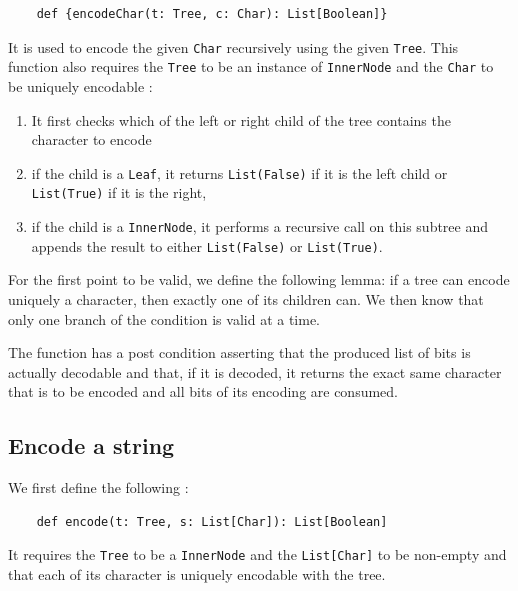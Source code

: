 \documentclass[a4paper,UKenglish,cleveref, autoref, thm-restate]{lipics-v2021}
\begin{document}
\begin{lstlisting}
    def {encodeChar(t: Tree, c: Char): List[Boolean]} 
\end{lstlisting}

It is used to encode the given \lstinline{Char} recursively using the given \lstinline{Tree}. This function also requires the \lstinline{Tree} to be an instance of \lstinline{InnerNode} 
and the \lstinline{Char} to be uniquely encodable :

\begin{enumerate}
    \item It first checks which of the left or right child of the tree contains the character to encode
    \item if the child is a \lstinline{Leaf}, it returns \lstinline{List(False)} if it is the left child or \lstinline{List(True)} if it is the right,
    \item if the child is a \lstinline{InnerNode}, it performs a recursive call on this subtree and appends the result to either \lstinline{List(False)} or \lstinline{List(True)}.
\end{enumerate}

For the first point to be valid, we define the following lemma: if a tree can encode uniquely a character, then exactly one of its children can. We then know that only one branch of the condition is valid at a time.

The function has a post condition asserting that the produced list of bits is actually decodable and that, if it is decoded, it returns the exact same character that is to be encoded and all bits of its encoding are consumed.

\subsection{Encode a string}
We first define the following :

\begin{lstlisting}
    def encode(t: Tree, s: List[Char]): List[Boolean]
\end{lstlisting}

It requires the \lstinline{Tree} to be a \lstinline{InnerNode} and  the \lstinline{List[Char]} to be non-empty and that each of its character is uniquely encodable with the tree.
\end{document}
